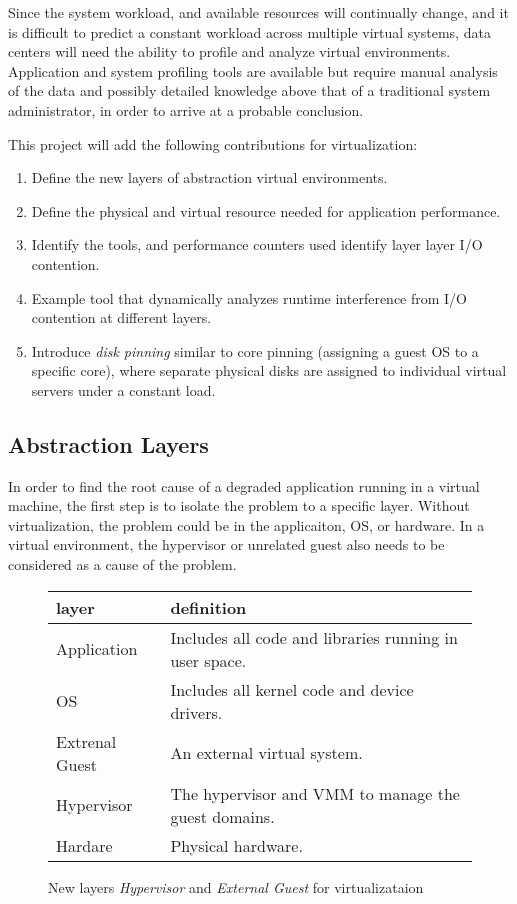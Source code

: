 Since the system workload, and available resources will continually change, and it is difficult to predict a constant workload across multiple virtual systems, data centers will need the ability to profile and analyze virtual environments.  Application and system profiling tools are available but require manual analysis of the data and possibly detailed knowledge above that of a traditional system administrator, in order to arrive at a probable conclusion.   

\indent This project will add the following contributions for virtualization:
\begin{enumerate}
\item Define the new layers of abstraction virtual environments.
\item Define the physical and virtual resource needed for application performance.
\item Identify the tools, and performance counters used identify layer layer I/O contention.
\item Example tool that dynamically analyzes runtime interference from I/O contention at different layers.
\item Introduce \emph{disk pinning} similar to core pinning (assigning a guest OS to a specific core), where separate physical disks are assigned to individual virtual servers under a constant load.  
\end{enumerate}

\subsection{Abstraction Layers}
In order to find the root cause of a degraded application running in a virtual machine, the first step is to isolate the problem to a specific layer. Without virtualization, the problem could be in the applicaiton, OS, or hardware.  In a virtual environment, the hypervisor or unrelated guest also needs to be considered as a cause of the problem.  
\begin{figure}
\begin{tabular}{ l p{5cm} }
  layer & definition \\
  \hline
  Application & Includes all code and libraries running in user space. \\
  OS & Includes all kernel code and device drivers. \\
  Extrenal Guest & An external virtual system. \\
  Hypervisor & The hypervisor and VMM to manage the guest domains. \\
  Hardare & Physical hardware. \\
\end{tabular}
\caption{New layers \emph{Hypervisor} and \emph{External Guest} for virtualizataion}
\label{fig:layers}
\end{figure}

